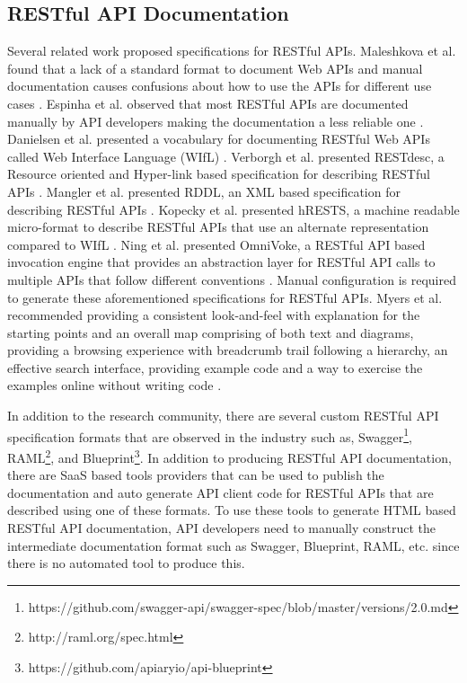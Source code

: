 \subsection{RESTful API Documentation} %
\label{sub:restful_api_documentation}

Several related work proposed specifications for RESTful APIs. Maleshkova et al. found that a lack of a standard format to document Web APIs and manual documentation causes confusions about how to use the APIs for different use cases \cite{Maleshkova_investigating}. Espinha et al. observed that most RESTful APIs are documented manually by API developers making the documentation a less reliable one \cite{Espinha_web}. Danielsen et al. presented a vocabulary for documenting RESTful Web APIs called Web Interface Language (WIfL) \cite{Danielsen_validation}. Verborgh et al. presented RESTdesc, a Resource oriented and Hyper-link based specification for describing RESTful APIs \cite{Verborgh_functional}. Mangler et al. presented RDDL, an XML based specification for describing RESTful APIs \cite{Mangler_rddl}. Kopecky et al. presented hRESTS, a machine readable micro-format to describe RESTful APIs that use an alternate representation compared to WIfL \cite{Kopecky_hrests}. Ning et al. presented OmniVoke, a RESTful API based invocation engine that provides an abstraction layer for RESTful API calls to multiple APIs that follow different conventions \cite{Ning_omnivoke}. Manual configuration is required to generate these aforementioned specifications for RESTful APIs. Myers et al. recommended providing a consistent look-and-feel with explanation for the starting points and an overall map comprising of both text and diagrams, providing a browsing experience with breadcrumb trail following a hierarchy, an effective search interface, providing example code and a way to exercise the examples online without writing code \cite{Myers_study}.

In addition to the research community, there are several custom RESTful API specification formats that are observed in the industry such as, Swagger\footnote{https://github.com/swagger-api/swagger-spec/blob/master/versions/2.0.md}, RAML\footnote{http://raml.org/spec.html}, and Blueprint\footnote{https://github.com/apiaryio/api-blueprint}. In addition to producing RESTful API documentation, there are SaaS based tools providers that can be used to publish the documentation and auto generate API client code for RESTful APIs that are described using one of these formats. To use these tools to generate HTML based RESTful API documentation, API developers need to manually construct the intermediate documentation format such as Swagger, Blueprint, RAML, etc. since there is no automated tool to produce this.


